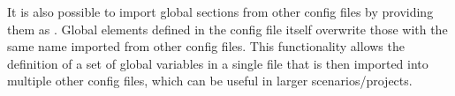 It is also possible to import global sections from other config files by providing them as .
Global elements defined in the config file itself overwrite those with the same name imported from other config files.
This functionality allows the definition of a set of global variables in a single file that is then imported into multiple
other config files, which can be useful in larger scenarios/projects.
